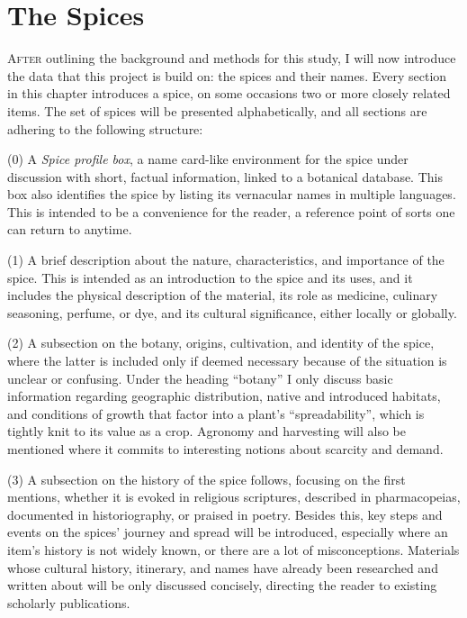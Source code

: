 \chapter{The Spices}
\label{ch:data}

\lettrine[lines=\iniciale,slope=0.5em,findent=-1em]{\textcolor{\accentcolor}{A}}{fter} outlining the background and methods for this study, I will now introduce the data that this project is build on: the spices and their names. Every section in this chapter introduces a spice, on some occasions two or more closely related items. The set of spices will be presented alphabetically, and all sections are adhering to the following structure: 

(0) A \textit{Spice profile box}, a name card-like environment for the spice under discussion with short, factual information, linked to a botanical database. This box also identifies the spice by listing its vernacular names in multiple languages. This is intended to be a convenience for the reader, a reference point of sorts one can return to anytime.

(1) A brief description about the nature, characteristics, and importance of the spice. This is intended as an introduction to the spice and its uses, and it includes the physical description of the material, its role as medicine, culinary seasoning, perfume, or dye, and its cultural significance, either locally or globally. 

(2) A subsection on the botany, origins, cultivation, and identity of the spice, where the latter is included only if deemed necessary because of the situation is unclear or confusing. Under the heading ``botany'' I only discuss basic information regarding geographic distribution, native and introduced habitats, and conditions of growth that factor into a plant's ``spreadability'', which is tightly knit to its value as a crop. Agronomy and harvesting will also be mentioned where it commits to interesting notions about scarcity and demand.

(3) A subsection on the history of the spice follows, focusing on the first mentions, whether it is evoked in religious scriptures, described in pharmacopeias, documented in historiography, or praised in poetry. Besides this, key steps and events on the spices' journey and spread will be introduced, especially where an item's history is not widely known, or there are a lot of misconceptions. Materials whose cultural history, itinerary, and names have already been researched and written about will be only discussed concisely, directing the reader to existing scholarly publications. 

